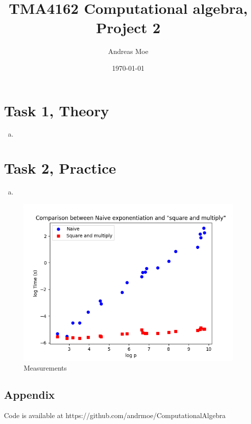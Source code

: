 \documentclass[12pt,a4paper]{article}
\title{TMA4162 Computational algebra, Project 2}
\author{Andreas Moe}
\date{\today}
\begin{document}
\maketitle

\section*{Task 1, Theory}
\begin{enumerate}[a)]
    \item 
\end{enumerate}

\section*{Task 2, Practice}

\begin{enumerate}[a)]
    \item 
\end{enumerate}

\begin{figure}[htbp]
    \centering
    \includegraphics[width=\linewidth]{plot_2025-01-24 14-39-00_0.png}
    \caption{Measurements}
    \label{figure1}
\end{figure}
\newpage
\begin{appendix}
\section*{Appendix}
    Code is available at https://github.com/andrmoe/ComputationalAlgebra
    
    
\end{appendix}
\end{document}

